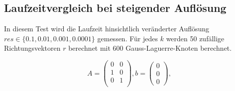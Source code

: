 \subsection{Laufzeitvergleich bei steigender Auflösung}


In diesem Test wird die Laufzeit hinsichtlich veränderter Auflösung $res \in \{ 0.1, 0.01, 0.001, 0.0001 \}$ gemessen.
Für jedes $k$ werden 50 zufällige Richtungsvektoren $r$ berechnet mit 600 Gauss-Laguerre-Knoten berechnet.

\begin{equation}
  A = \begin{pmatrix}
      0 & 0 \\
      1 & 0 \\
      0 & 1 \\
  \end{pmatrix}, b = \begin{pmatrix}
      0 \\ 0\\ 0
  \end{pmatrix},
\end{equation}
    
